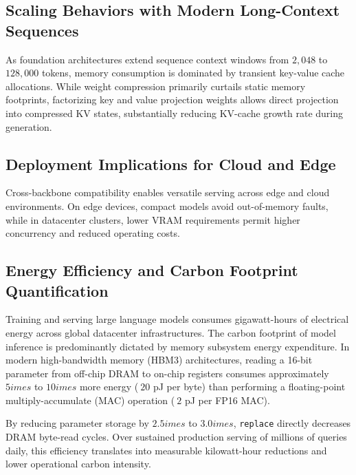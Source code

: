 \subsection{Scaling Behaviors with Modern Long-Context Sequences}
As foundation architectures extend sequence context windows from $2{,}048$ to $128{,}000$ tokens, memory consumption is dominated by transient key-value cache allocations. While weight compression primarily curtails static memory footprints, factorizing key and value projection weights allows direct projection into compressed KV states, substantially reducing KV-cache growth rate during generation.

\subsection{Deployment Implications for Cloud and Edge}
Cross-backbone compatibility enables versatile serving across edge and cloud environments. On edge devices, compact models avoid out-of-memory faults, while in datacenter clusters, lower VRAM requirements permit higher concurrency and reduced operating costs.

\subsection{Energy Efficiency and Carbon Footprint Quantification}
Training and serving large language models consumes gigawatt-hours of electrical energy across global datacenter infrastructures. The carbon footprint of model inference is predominantly dictated by memory subsystem energy expenditure. In modern high-bandwidth memory (HBM3) architectures, reading a 16-bit parameter from off-chip DRAM to on-chip registers consumes approximately $5	imes$ to $10	imes$ more energy ($~20$ pJ per byte) than performing a floating-point multiply-accumulate (MAC) operation ($~2$ pJ per FP16 MAC).

By reducing parameter storage by $2.5	imes$ to $3.0	imes$, \texttt{replace} directly decreases DRAM byte-read cycles. Over sustained production serving of millions of queries daily, this efficiency translates into measurable kilowatt-hour reductions and lower operational carbon intensity.
